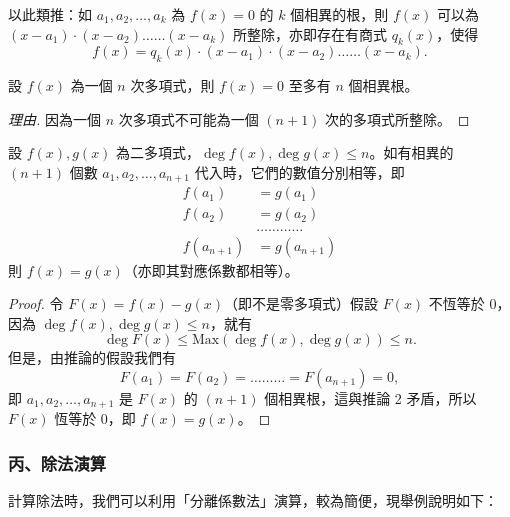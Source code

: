 以此類推：如 $a_1, a_2, \dots, a_k$ 為 $f(x)=0$ 的 $k$ 個相異的根，則 $f(x)$ 可以為 $(x-a_1) \cdot (x-a_2) \dots\dots (x-a_k)$ 所整除，亦即存在有商式 $q_k(x)$，使得
\begin{equation*}
  f(x) = q_k(x) \cdot (x-a_1) \cdot (x-a_2) \dots\dots (x-a_k).
\end{equation*}

\begin{corollary}\label{cor:root_num_bound}
設 $f(x)$ 為一個 $n$ 次多項式，則 $f(x)=0$ 至多有 $n$ 個相異根。
\end{corollary}

\begin{proof}[理由]
因為一個 $n$ 次多項式不可能為一個 $(n+1)$ 次的多項式所整除。
\end{proof}

\begin{corollary}\label{cor:ident_poly}
設 $f(x), g(x)$ 為二多項式，$\deg f(x), \deg g(x) \le n$。如有相異的 $(n+1)$ 個數 $a_1, a_2, \dots, a_{n+1}$ 代入時，它們的數值分別相等，即
\begin{align*}
  f(a_1) &= g(a_1) \\
  f(a_2) &= g(a_2) \\
  &\dots\dots\dots\dots \\
  f(a_{n+1}) &= g(a_{n+1})
\end{align*}
則 $f(x)=g(x)$（亦即其對應係數都相等）。
\end{corollary}

\begin{proof}
令 $F(x)=f(x)-g(x)$（即不是零多項式）假設 $F(x)$ 不恆等於 $0$，因為 $\deg f(x), \deg g(x) \le n$，就有
\begin{equation*}
  \deg F(x) \le \text{Max}(\deg f(x), \deg g(x)) \le n.
\end{equation*}
但是，由推論的假設我們有
\begin{equation*}
  F(a_1) = F(a_2) = \dots\dots\dots = F(a_{n+1}) = 0,
\end{equation*}
即 $a_1, a_2, \dots, a_{n+1}$ 是 $F(x)$ 的 $(n+1)$ 個相異根，這與推論 2 矛盾，所以 $F(x)$ 恆等於 $0$，即 $f(x)=g(x)$。
\end{proof}

\subsubsection*{丙、除法演算}\label{subsec:5-4-c}

計算除法時，我們可以利用「分離係數法」演算，較為簡便，現舉例說明如下：

